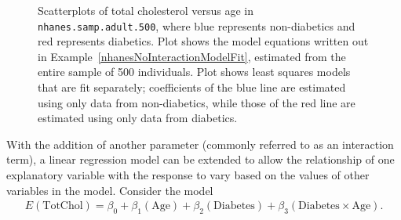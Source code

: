 \begin{figure}[h]
	\centering
{}
	\caption{Scatterplots of total cholesterol versus age in \texttt{nhanes.samp.adult.500}, where blue represents non-diabetics and red represents diabetics. Plot  shows the model equations written out in Example~\ref{nhanesNoInteractionModelFit}, estimated from the entire sample of 500 individuals. Plot  shows least squares models that are fit separately; coefficients of the blue line are estimated using only data from non-diabetics, while those of the red line are estimated using only data from diabetics. }
	\label{nhanesInteractionScatterPlotComparison}
\end{figure}

\textD{\newpage}

With the addition of another parameter (commonly referred to as an interaction term), a linear regression model can be extended to allow the relationship of one explanatory variable with the response to vary based on the values of other variables in the model. Consider the model
\begin{align}\label{nhanesAgeDiabetesInteractionModel}
E(\text{TotChol}) = \beta_0 + \beta_1(\text{Age}) + \beta_2(\text{Diabetes}) + 
\beta_3 (\text{Diabetes} \times \text{Age}). 
\end{align}

